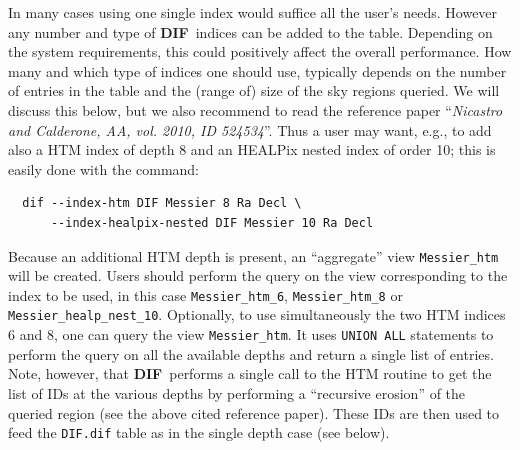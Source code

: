 \documentclass[10pt,titlepage]{article}
\newcommand{\dif}{\textbf{\small DIF}}
\begin{document}
%
In many cases using one single index would suffice all the user's needs.
However any number and type of \dif\ indices can be added to the table.
Depending on the system requirements, this could positively affect the
overall performance.
How many and which type of indices one should use, typically depends on the
number of entries in the table and the (range of) size of the sky regions
queried. We will discuss this below, but we also recommend to read the
reference paper ``\emph{Nicastro and Calderone, AA, vol. 2010, ID 524534}''.
Thus a user may want, e.g., to add
also a HTM index of depth 8 and an HEALPix nested index of order 10;
this is easily done with the command:
\begin{verbatim}
  dif --index-htm DIF Messier 8 Ra Decl \
      --index-healpix-nested DIF Messier 10 Ra Decl
\end{verbatim}
Because an additional HTM depth is present, an ``aggregate'' view
{\tt Messier\_htm} will be created.
Users should perform the query on the view corresponding to the index
to be used, in this case {\tt Messier\_htm\_6}, {\tt Messier\_htm\_8} or {\tt
Messier\_healp\_nest\_10}. Optionally, to use simultaneously the two
HTM indices 6 and 8, one can query the view {\tt Messier\_htm}.
It uses {\tt UNION ALL} statements to perform the query on all the
available depths and return a single list of entries. Note, however, that
\dif\ performs a single call to the HTM routine to get the
list of IDs at the various depths by performing a ``recursive erosion''
of the queried region (see the above cited reference paper). These IDs are
then used to feed the {\tt DIF.dif} table as in the single depth case
(see below).

%
\end{document}
